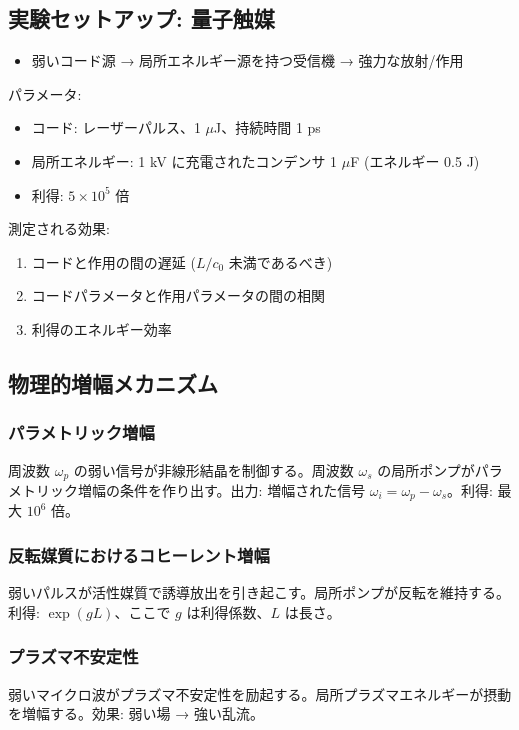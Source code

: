 \documentclass[11pt,a4paper]{article}
\begin{document}
	\subsection{実験セットアップ: 量子触媒}
	
	\begin{itemize}
		\item 弱いコード源 → 局所エネルギー源を持つ受信機 → 強力な放射/作用
	\end{itemize}
	
	パラメータ:
	\begin{itemize}
		\item コード: レーザーパルス、1 $\mu$J、持続時間 1 ps
		\item 局所エネルギー: 1 kV に充電されたコンデンサ 1 $\mu$F (エネルギー 0.5 J)
		\item 利得: $5 \times 10^5$ 倍
	\end{itemize}
	
	測定される効果:
	\begin{enumerate}
		\item コードと作用の間の遅延 ($L/c_0$ 未満であるべき)
		\item コードパラメータと作用パラメータの間の相関
		\item 利得のエネルギー効率
	\end{enumerate}
	
	\subsection{物理的増幅メカニズム}
	
	\subsubsection{パラメトリック増幅}
	周波数 $\omega_p$ の弱い信号が非線形結晶を制御する。周波数 $\omega_s$ の局所ポンプがパラメトリック増幅の条件を作り出す。出力: 増幅された信号 $\omega_i = \omega_p - \omega_s$。利得: 最大 $10^6$ 倍。
	
	\subsubsection{反転媒質におけるコヒーレント増幅}
	弱いパルスが活性媒質で誘導放出を引き起こす。局所ポンプが反転を維持する。利得: $\exp(gL)$、ここで $g$ は利得係数、$L$ は長さ。
	
	\subsubsection{プラズマ不安定性}
	弱いマイクロ波がプラズマ不安定性を励起する。局所プラズマエネルギーが摂動を増幅する。効果: 弱い場 → 強い乱流。
	
\end{document}
